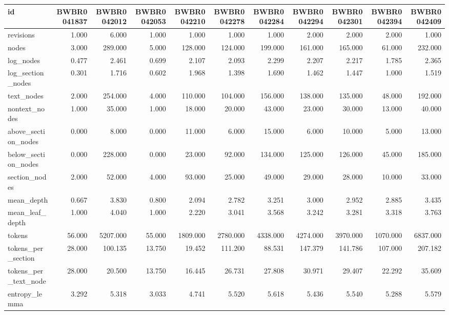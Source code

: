 \begin{tabular}{lrrrrrrrrrr}
\toprule
id & BWBR0041837 & BWBR0042012 & BWBR0042053 & BWBR0042210 & BWBR0042278 & BWBR0042284 & BWBR0042294 & BWBR0042301 & BWBR0042394 & BWBR0042409 \\
\midrule
revisions & 1.000 & 6.000 & 1.000 & 1.000 & 1.000 & 1.000 & 2.000 & 2.000 & 2.000 & 1.000 \\
\cline{1-11}
nodes & 3.000 & 289.000 & 5.000 & 128.000 & 124.000 & 199.000 & 161.000 & 165.000 & 61.000 & 232.000 \\
\cline{1-11}
log\_nodes & 0.477 & 2.461 & 0.699 & 2.107 & 2.093 & 2.299 & 2.207 & 2.217 & 1.785 & 2.365 \\
\cline{1-11}
log\_section\_nodes & 0.301 & 1.716 & 0.602 & 1.968 & 1.398 & 1.690 & 1.462 & 1.447 & 1.000 & 1.519 \\
\cline{1-11}
text\_nodes & 2.000 & 254.000 & 4.000 & 110.000 & 104.000 & 156.000 & 138.000 & 135.000 & 48.000 & 192.000 \\
\cline{1-11}
nontext\_nodes & 1.000 & 35.000 & 1.000 & 18.000 & 20.000 & 43.000 & 23.000 & 30.000 & 13.000 & 40.000 \\
\cline{1-11}
above\_section\_nodes & 0.000 & 8.000 & 0.000 & 11.000 & 6.000 & 15.000 & 6.000 & 10.000 & 5.000 & 13.000 \\
\cline{1-11}
below\_section\_nodes & 0.000 & 228.000 & 0.000 & 23.000 & 92.000 & 134.000 & 125.000 & 126.000 & 45.000 & 185.000 \\
\cline{1-11}
section\_nodes & 2.000 & 52.000 & 4.000 & 93.000 & 25.000 & 49.000 & 29.000 & 28.000 & 10.000 & 33.000 \\
\cline{1-11}
mean\_depth & 0.667 & 3.830 & 0.800 & 2.094 & 2.782 & 3.251 & 3.000 & 2.952 & 2.885 & 3.435 \\
\cline{1-11}
mean\_leaf\_depth & 1.000 & 4.040 & 1.000 & 2.220 & 3.041 & 3.568 & 3.242 & 3.281 & 3.318 & 3.763 \\
\cline{1-11}
tokens & 56.000 & 5207.000 & 55.000 & 1809.000 & 2780.000 & 4338.000 & 4274.000 & 3970.000 & 1070.000 & 6837.000 \\
\cline{1-11}
tokens\_per\_section & 28.000 & 100.135 & 13.750 & 19.452 & 111.200 & 88.531 & 147.379 & 141.786 & 107.000 & 207.182 \\
\cline{1-11}
tokens\_per\_text\_node & 28.000 & 20.500 & 13.750 & 16.445 & 26.731 & 27.808 & 30.971 & 29.407 & 22.292 & 35.609 \\
\cline{1-11}
entropy\_lemma & 3.292 & 5.318 & 3.033 & 4.741 & 5.520 & 5.618 & 5.436 & 5.540 & 5.288 & 5.579 \\

\end{tabular}
